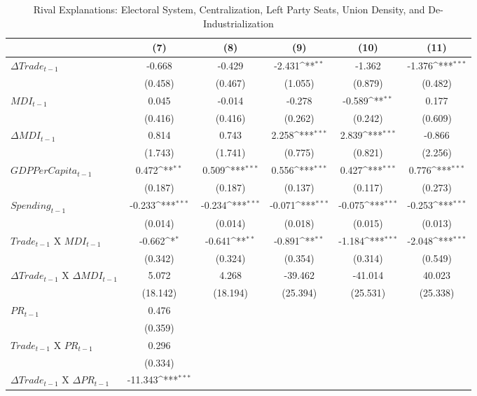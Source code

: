 \def\sym#1{\ifmmode^{#1}\else\(^{#1}\)\fi}
\begin{table}[htbp]
\footnotesize
\centering
\caption{Rival Explanations: Electoral System, Centralization, Left Party Seats, Union Density, and De-Industrialization}
\begin{tabular}{l*{5}{c}}
\hline\hline
  &\multicolumn{1}{c}{(7)} &\multicolumn{1}{c}{(8)} &\multicolumn{1}{c}{(9)} &\multicolumn{1}{c}{(10)} &\multicolumn{1}{c}{(11)} \\
\hline
$\Delta Trade_{t-1}$ 		&-0.668 		&-0.429 		&-2.431\sym{**} 		&-1.362 		&-1.376\sym{***} \\
  		&(0.458) 		&(0.467) 		&(1.055) 		&(0.879) 		&(0.482) \\
$MDI_{t-1}$ 		&0.045 		&-0.014 		&-0.278 		&-0.589\sym{**} 		&0.177 \\
  		&(0.416) 		&(0.416) 		&(0.262) 		&(0.242) 		&(0.609) \\
$\Delta MDI_{t-1}$		&0.814 		&0.743 		&2.258\sym{***} 		&2.839\sym{***} 		&-0.866 \\
  		&(1.743) 		&(1.741) 		&(0.775) 		&(0.821) 		&(2.256) \\
$GDP Per Capita_{t-1}$ 		&0.472\sym{**} 		&0.509\sym{***} 		&0.556\sym{***} 		&0.427\sym{***} 		&0.776\sym{***} \\
  		&(0.187) 		&(0.187) 		&(0.137) 		&(0.117) 		&(0.273) \\
$Spending_{t-1}$ 		 		&-0.233\sym{***} 		&-0.234\sym{***} 		&-0.071\sym{***} 		&-0.075\sym{***} 		&-0.253\sym{***} \\
  		&(0.014) 		&(0.014) 		&(0.018) 		&(0.015) 		&(0.013) \\
$Trade_{t-1}$ X $MDI_{t-1}$ 		&-0.662\sym{*} 		&-0.641\sym{**} 		&-0.891\sym{**} 		&-1.184\sym{***} 		&-2.048\sym{***} \\
  		&(0.342) 		&(0.324) 		&(0.354) 		&(0.314) 		&(0.549) \\
$\Delta Trade_{t-1}$ X $\Delta MDI_{t-1}$		&5.072 		&4.268 		&-39.462 		&-41.014 		&40.023 \\
  		&(18.142) 		&(18.194) 		&(25.394) 		&(25.531) 		&(25.338) \\
$PR_{t-1}$		&0.476 		& 		& 		& 		& \\
  		&(0.359) 		& 		& 		& 		& \\
$Trade_{t-1}$ X $PR_{t-1}$ 		&0.296 		& 		& 		& 		& \\
  		&(0.334) 		& 		& 		& 		& \\
$\Delta Trade_{t-1}$ X $\Delta PR_{t-1}$		&-11.343\sym{***} 		& 		& 		& 		& \\

\end{tabular}
\end{table}
